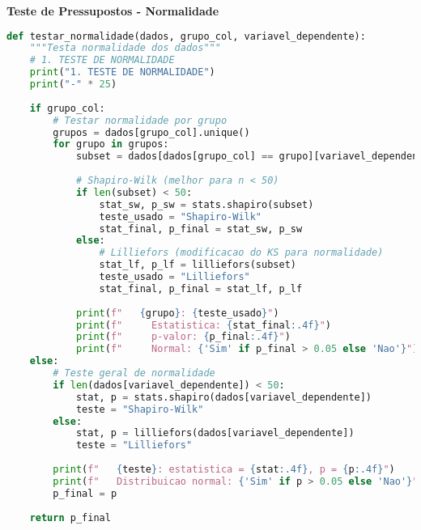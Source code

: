 \begin{examplebox}
\textbf{Teste de Pressupostos - Normalidade}

\begin{lstlisting}[language=Python]
def testar_normalidade(dados, grupo_col, variavel_dependente):
    """Testa normalidade dos dados"""
    # 1. TESTE DE NORMALIDADE
    print("1. TESTE DE NORMALIDADE")
    print("-" * 25)
    
    if grupo_col:
        # Testar normalidade por grupo
        grupos = dados[grupo_col].unique()
        for grupo in grupos:
            subset = dados[dados[grupo_col] == grupo][variavel_dependente]
            
            # Shapiro-Wilk (melhor para n < 50)
            if len(subset) < 50:
                stat_sw, p_sw = stats.shapiro(subset)
                teste_usado = "Shapiro-Wilk"
                stat_final, p_final = stat_sw, p_sw
            else:
                # Lilliefors (modificacao do KS para normalidade)
                stat_lf, p_lf = lilliefors(subset)
                teste_usado = "Lilliefors"
                stat_final, p_final = stat_lf, p_lf
            
            print(f"   {grupo}: {teste_usado}")
            print(f"     Estatistica: {stat_final:.4f}")
            print(f"     p-valor: {p_final:.4f}")
            print(f"     Normal: {'Sim' if p_final > 0.05 else 'Nao'}")
    else:
        # Teste geral de normalidade
        if len(dados[variavel_dependente]) < 50:
            stat, p = stats.shapiro(dados[variavel_dependente])
            teste = "Shapiro-Wilk"
        else:
            stat, p = lilliefors(dados[variavel_dependente])
            teste = "Lilliefors"
        
        print(f"   {teste}: estatistica = {stat:.4f}, p = {p:.4f}")
        print(f"   Distribuicao normal: {'Sim' if p > 0.05 else 'Nao'}")
        p_final = p
    
    return p_final
\end{lstlisting}
\end{examplebox}

